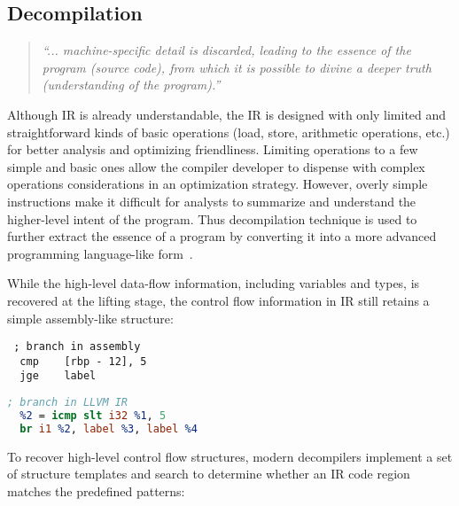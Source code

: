 \subsection{Decompilation} \label{subsec:background-decompilation}

\begin{quote}
\textit{``... machine-specific detail is discarded, leading to the essence of
the program (source code), from which it is possible to divine a deeper truth
(understanding of the program).''}~\cite{van2007static}
\end{quote}

Although IR is already understandable, the IR is designed with only limited
and straightforward kinds of basic operations (load, store, arithmetic
operations, etc.) for better analysis and optimizing friendliness. Limiting
operations to a few simple and basic ones allow the compiler developer to
dispense with complex operations considerations in an optimization strategy.
However, overly simple instructions make it difficult for analysts to
summarize and understand the higher-level intent of the program. Thus
decompilation technique is used to further extract the essence of a program by
converting it into a more advanced programming language-like
form~\cite{van2007static,fokin2010reconstruction,engel2011enhanced,brumley2013native}.

While the high-level data-flow information, including variables and types, is
recovered at the lifting stage, the control flow information in IR still
retains a simple assembly-like structure:

\vspace*{3pt}
\noindent\hspace*{36pt}\begin{minipage}{.40\linewidth}
\begin{lstlisting}
 ; branch in assembly
  cmp	 [rbp - 12], 5
  jge	 label
\end{lstlisting}
\end{minipage}\hspace*{24pt}
\begin{minipage}{.40\linewidth}
\begin{lstlisting}[language=llvm]
 ; branch in LLVM IR
  %2 = icmp slt i32 %1, 5
  br i1 %2, label %3, label %4
\end{lstlisting}
\end{minipage}

To recover high-level control flow structures, modern decompilers implement a
set of structure templates and search to determine whether an IR code region
matches the predefined patterns:

